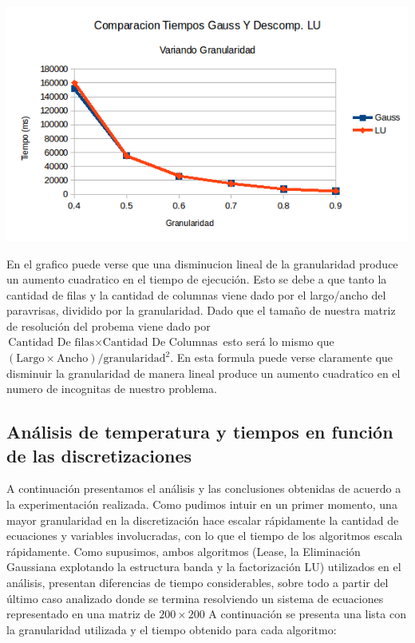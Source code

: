 \begin{center}
 \includegraphics[width=400pt]{imagenes/testeo/granuGauss.png}
\end{center}

En el grafico puede verse que una disminucion lineal de la granularidad produce un aumento cuadratico en el tiempo de ejecución. Esto se debe a que tanto la cantidad de filas y la cantidad de columnas viene dado por el largo/ancho del paravrisas, dividido por la granularidad. Dado que el tamaño de nuestra matriz de resolución del probema viene dado por $\text{Cantidad De filas} \times \text{Cantidad De Columnas}$ esto será lo mismo que  $(\text{Largo} \times \text{Ancho}) / \text{granularidad}^2$. En esta formula puede verse claramente que disminuir la granularidad de manera lineal produce un aumento cuadratico en el numero de incognitas de nuestro problema.

\subsection{An\'alisis de temperatura y tiempos en funci\'on de las discretizaciones}
A continuaci\'on presentamos el an\'alisis y las conclusiones obtenidas de acuerdo a la experimentaci\'on realizada.
Como pudimos intuir en un primer momento, una mayor granularidad en la discretizaci\'on hace escalar r\'apidamente la cantidad de ecuaciones y variables involucradas, con lo que el tiempo de los algoritmos escala r\'apidamente. Como supusimos, ambos algoritmos (Lease, la Eliminaci\'on Gaussiana explotando la estructura banda y la factorizaci\'on LU) utilizados en el an\'alisis,  presentan diferencias de tiempo considerables, sobre todo a partir del \'ultimo caso analizado donde se termina resolviendo un sistema de ecuaciones representado en una matriz de $200 \times 200$
A continuaci\'on se presenta una lista con la granularidad utilizada y el tiempo obtenido para cada algoritmo:


